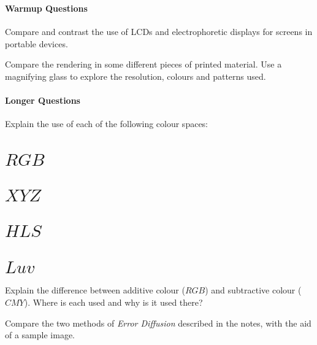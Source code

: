 \documentclass{supervision}
\begin{document}
\section*{\Topics}
\subsection*{Warmup Questions}
\begin{questions}
  \question Compare and contrast the use of LCDs and electrophoretic displays
    for screens in portable devices.

  \question Compare the rendering in some different pieces of printed
    material. Use a magnifying glass to explore the resolution, colours and
    patterns used.

\end{questions}

\subsection*{Longer Questions}
\begin{questions}
  \question Explain the use of each of the following colour spaces:
    \begin{parts}
      \part{$RGB$}
      \part{$XYZ$}
      \part{$HLS$}
      \part{$Luv$}
    \end{parts}
  \question Explain the difference between additive colour (${RGB}$) and
    subtractive colour (${CMY}$). Where is each used and why is it used there?

  \question Compare the two methods of \emph{Error Diffusion} described in the
    notes, with the aid of a sample image.

\end{questions}
\end{document}
